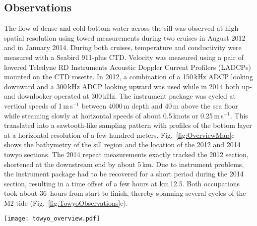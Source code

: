 \documentclass{ametsocV6.1}
\begin{document}
\subsection{Observations}\label{sec:Observations}
The flow of dense and cold bottom water across the sill was observed at high spatial resolution using towed measurements during two cruises in August 2012 and in January 2014.
During both cruises, temperature and conductivity were measured with a Seabird 911-plus CTD.
Velocity was measured using a pair of lowered Teledyne RD Instruments Acoustic Doppler Current Profilers (LADCPs) mounted on the CTD rosette.
In 2012, a combination of a 150\,kHz ADCP looking downward and a 300\,kHz ADCP looking upward was used while in 2014 both up- and downlooker operated at 300\,kHz.
The instrument package was cycled at vertical speeds of 1\,m\,s$^{-1}$ between 4000\,m depth and 40\,m above the sea floor while steaming slowly at horizontal speeds of about 0.5\,knots or 0.25\,m\,s$^{-1}$.
This translated into a sawtooth-like sampling pattern with profiles of the bottom layer at a horizontal resolution of a few hundred meters.
Fig.~\ref{fig:OverviewMap}c shows the bathymetry of the sill region and the location of the 2012 and 2014 towyo sections.
The 2014 repeat measurements exactly tracked the 2012 section, shortened at the downstream end by about 5\,km.
Due to instrument problems, the instrument package had to be recovered for a short period during the 2014 section, resulting in a time offset of a few hours at km\,12.5.
Both occupations took about 36~hours from start to finish, thereby spanning several cycles of the M2 tide (Fig.~\ref{fig:TowyoObservations}e).

\begin{figure*}
\centerline{\texttt{[image: towyo\_overview.pdf]}}
\caption{
Towyo-sections across the northern sill from 2012 (left) and 2014 (right).
({\bf a}) Potential temperature $\theta$ (color) and vertical velocity $w$ (black and white arrows showing upward/downward velocities, respectively, with scale given to lower right) with profile markers and a number of time stamps at top.
({\bf b}) Northward velocity $v$ (color) and $\sigma_4=45.94$\,kg\,m$^{-3}$ isopycnal tracing the upper interface (black contour).
({\bf c}) Square of vertical shear $(\partial v/\partial z)^2$ (color) and isopycnal from panel b.
({\bf d}) Turbulent dissipation $\varepsilon$ from Thorpe-scale estimates.
({\bf e}) Barotropic tide prediction \citep[TPXO,][]{egberterofeeva02} for times and locations along the section.
Note the sharp transition in measured properties and tidal phase for the 2014 section at km\,12 where the instrument had to be recovered for a few hours.
}
\label{fig:TowyoObservations}
\end{figure*}
\end{document}
